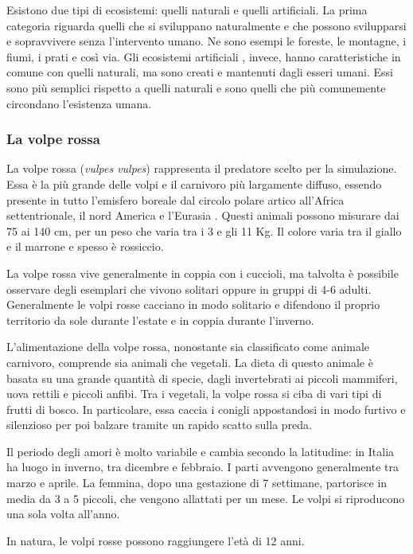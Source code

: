 \documentclass[11pt]{article}
\begin{document}
Esistono due tipi di ecosistemi: quelli naturali e quelli artificiali. La prima categoria riguarda quelli che si sviluppano naturalmente e che possono svilupparsi e sopravvivere senza l'intervento umano. Ne sono esempi le foreste, le montagne, i fiumi, i prati e così via. Gli ecosistemi artificiali \cite{ArtificialEcosystems}, invece, hanno caratteristiche in comune con quelli naturali, ma sono creati e mantenuti dagli esseri umani. Essi sono più semplici rispetto a quelli naturali e sono quelli che più comunemente circondano l'esistenza umana. 

\subsubsection{La volpe rossa}
\label{volpe}
La volpe rossa (\emph{vulpes vulpes}) rappresenta il predatore scelto per la simulazione. Essa è la più grande delle volpi e il carnivoro più largamente diffuso, essendo presente in tutto l'emisfero boreale dal circolo polare artico all'Africa settentrionale, il nord America e l'Eurasia \cite{WikiVolpe}.
Questi animali possono misurare dai 75 ai 140 cm, per un peso che varia tra i 3 e gli 11 Kg. Il colore varia tra il giallo e il marrone e spesso è rossiccio. 

La volpe rossa vive generalmente in coppia con i cuccioli, ma talvolta è possibile osservare degli esemplari che vivono solitari oppure in gruppi di 4-6 adulti. Generalmente le volpi rosse cacciano in modo solitario e difendono il proprio territorio da sole durante l'estate e in coppia durante l'inverno. 

L'alimentazione della volpe rossa, nonostante sia classificato come animale carnivoro, comprende sia animali che vegetali. La dieta di questo animale è basata su una grande quantità di specie, dagli invertebrati ai piccoli mammiferi, uova rettili e piccoli anfibi. Tra i vegetali, la volpe rossa si ciba di vari tipi di frutti di bosco. In particolare, essa caccia i conigli appostandosi in modo furtivo e silenzioso per poi balzare tramite un rapido scatto sulla preda. 

Il periodo degli amori è molto variabile e cambia secondo la latitudine: in Italia ha luogo in inverno, tra dicembre e febbraio. I parti avvengono generalmente tra marzo e aprile. La femmina, dopo una gestazione di 7 settimane, partorisce in media da 3 a 5 piccoli, che vengono allattati per un mese. Le volpi si riproducono una sola volta all'anno. 

In natura, le volpi rosse possono raggiungere l'età di 12 anni.
\end{document}
